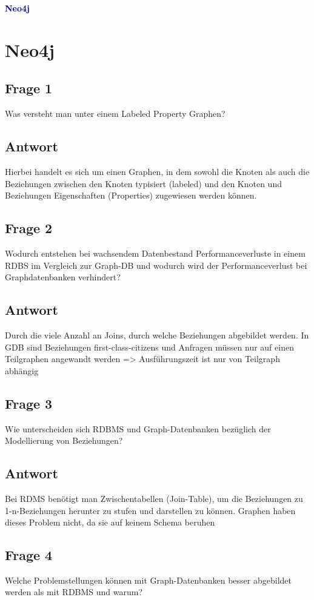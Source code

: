 \textbf{\textcolor{darkblue}{ Neo4j}}~

\section*{Neo4j}
\subsection*{Frage 1}
Was versteht man unter einem Labeled Property Graphen?
\subsection*{Antwort}
Hierbei handelt es sich um einen Graphen, in dem sowohl die Knoten als auch die Beziehungen zwischen den Knoten typisiert (labeled) und den Knoten und Beziehungen Eigenschaften (Properties) zugewiesen werden können. 
\subsection*{Frage 2}
Wodurch entstehen bei wachsendem Datenbestand Performanceverluste in einem RDBS im Vergleich zur Graph-DB und wodurch wird der Performanceverlust bei Graphdatenbanken verhindert?
\subsection*{Antwort}
Durch die viele Anzahl an Joins, durch welche Beziehungen abgebildet werden. In GDB sind Beziehungen first-class-citizens und Anfragen müssen nur auf einen Teilgraphen angewandt werden => Ausführungszeit ist nur von Teilgraph abhängig
\subsection*{Frage 3}
Wie unterscheiden sich RDBMS und Graph-Datenbanken bezüglich der Modellierung von Beziehungen?
\subsection*{Antwort}
Bei RDMS benötigt man Zwischentabellen (Join-Table), um die Beziehungen zu 1-n-Beziehungen herunter zu stufen und darstellen zu können.
Graphen haben dieses Problem nicht, da sie auf keinem Schema beruhen
\subsection*{Frage 4}
Welche Problemstellungen können mit Graph-Datenbanken besser abgebildet werden als mit RDBMS und warum?
